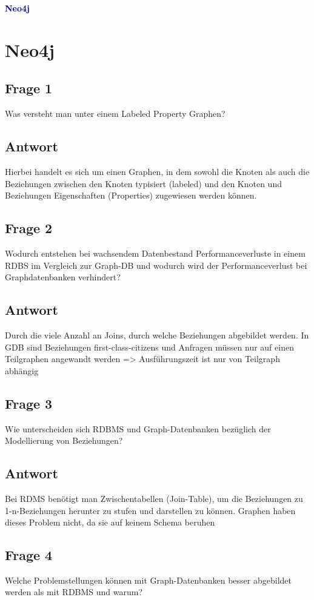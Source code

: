 \textbf{\textcolor{darkblue}{ Neo4j}}~

\section*{Neo4j}
\subsection*{Frage 1}
Was versteht man unter einem Labeled Property Graphen?
\subsection*{Antwort}
Hierbei handelt es sich um einen Graphen, in dem sowohl die Knoten als auch die Beziehungen zwischen den Knoten typisiert (labeled) und den Knoten und Beziehungen Eigenschaften (Properties) zugewiesen werden können. 
\subsection*{Frage 2}
Wodurch entstehen bei wachsendem Datenbestand Performanceverluste in einem RDBS im Vergleich zur Graph-DB und wodurch wird der Performanceverlust bei Graphdatenbanken verhindert?
\subsection*{Antwort}
Durch die viele Anzahl an Joins, durch welche Beziehungen abgebildet werden. In GDB sind Beziehungen first-class-citizens und Anfragen müssen nur auf einen Teilgraphen angewandt werden => Ausführungszeit ist nur von Teilgraph abhängig
\subsection*{Frage 3}
Wie unterscheiden sich RDBMS und Graph-Datenbanken bezüglich der Modellierung von Beziehungen?
\subsection*{Antwort}
Bei RDMS benötigt man Zwischentabellen (Join-Table), um die Beziehungen zu 1-n-Beziehungen herunter zu stufen und darstellen zu können.
Graphen haben dieses Problem nicht, da sie auf keinem Schema beruhen
\subsection*{Frage 4}
Welche Problemstellungen können mit Graph-Datenbanken besser abgebildet werden als mit RDBMS und warum?
